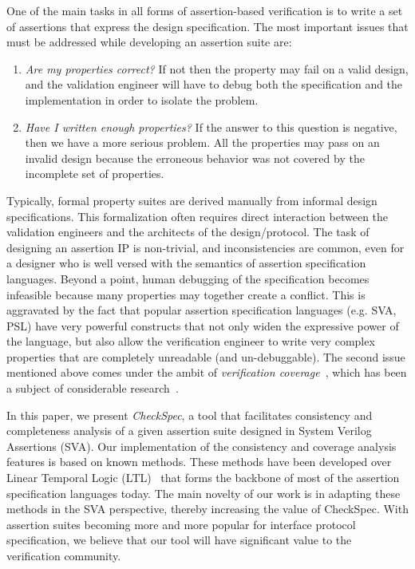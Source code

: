 \documentclass{svmult}
\begin{document}
One of the main tasks in all forms of assertion-based verification is to 
write a set of 
assertions that express the design specification. The most important issues 
that must be addressed while developing an assertion suite are:
\begin {enumerate}
\item {\em Are my properties correct?} If not then the property may fail on a 
valid design, and the validation engineer will have to debug both the 
specification and the implementation in order to isolate the problem.
\item {\em Have I written enough properties?} If the answer to this question 
is negative, then we have a more serious problem. All the properties may pass 
on an invalid design because the erroneous behavior was not covered by the 
incomplete set of properties.
\end{enumerate}
Typically, formal property suites are derived manually from informal design
specifications. This formalization often requires direct interaction between
the validation engineers and the architects of the design/protocol.
The task of designing an assertion IP
is non-trivial, and inconsistencies are common, even for
a designer who is well versed with the semantics of assertion
specification languages. Beyond a point, human debugging of the
specification becomes infeasible because many properties may together create
a conflict. This is aggravated by the fact that popular assertion
specification languages (e.g. SVA, PSL) have very powerful constructs
that not only widen the expressive power of the language, but also allow
the verification engineer to write very complex properties that are
completely unreadable (and un-debuggable). 
The second issue mentioned above comes under the ambit of {\em verification 
coverage}~\cite{roadmap}, which has been a subject of considerable 
research~\cite{roadmap}. 

In this paper, we present {\em CheckSpec}, a tool that facilitates 
consistency and completeness analysis of a given assertion suite designed in 
System Verilog Assertions (SVA). Our 
implementation of the consistency and coverage analysis features is based on 
known methods. These methods have been developed over Linear Temporal Logic 
(LTL)~\cite{roadmap} that forms the backbone of most of the assertion specification 
languages today. The main novelty of our work is in adapting these methods in 
the SVA perspective, thereby increasing the value of CheckSpec. With 
assertion suites becoming more and more popular for interface protocol 
specification, we believe that our tool will have significant value to the 
verification community.
\end{document}
